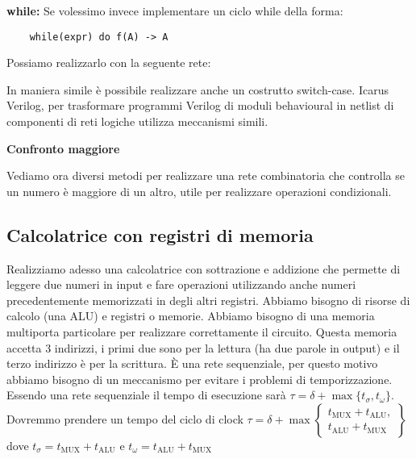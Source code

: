 \begin{defn}
	\textbf{while:}
	Se volessimo invece implementare un ciclo while della forma:
	\begin{Verbatim}
	while(expr) do f(A) -> A
	\end{Verbatim}
	Possiamo realizzarlo con la seguente rete:
	

	In maniera simile è possibile realizzare anche un costrutto switch-case.
	Icarus Verilog, per trasformare programmi Verilog di moduli behavioural in
	netlist di componenti di reti logiche utilizza meccanismi simili.
\end{defn}

\begin{exrc}
	\textbf{Confronto maggiore}

	Vediamo ora diversi metodi per realizzare una rete combinatoria che
	controlla se un numero è maggiore di un altro, utile per realizzare
	operazioni condizionali.
	
	
	\FloatBarrier	
\end{exrc}


\subsection{Calcolatrice con registri di memoria}
Realizziamo adesso una calcolatrice con sottrazione e addizione che permette di
leggere due numeri in input e fare operazioni utilizzando anche numeri
precedentemente memorizzati in degli altri registri. Abbiamo bisogno di risorse
di calcolo (una ALU) e registri o memorie. Abbiamo bisogno di una memoria
multiporta particolare per realizzare correttamente il circuito. Questa memoria
accetta 3 indirizzi, i primi due sono per la lettura (ha due parole in output) e
il terzo indirizzo è per la scrittura. È una rete sequenziale, per questo motivo
abbiamo bisogno di un meccanismo per evitare i problemi di temporizzazione.
Essendo una rete sequenziale il tempo di esecuzione sarà $ \tau = \delta +
\max\{t_\sigma, t_\omega\} $. Dovremmo prendere un tempo del ciclo di clock $
\tau = \delta + \max \left\{\begin{matrix} t_\text{MUX} + t_\text{ALU}, \\
t_\text{ALU} + t_\text{MUX} \end{matrix}\right\} $ dove $ t_\sigma =
t_\text{MUX} + t_\text{ALU} $ e $ t_\omega = t_\text{ALU} + t_\text{MUX} $


